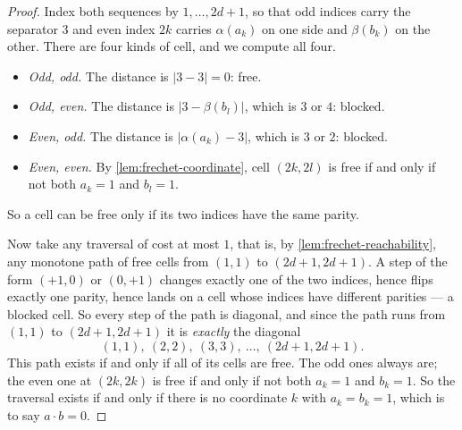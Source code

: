 \begin{proof}
Index both sequences by $1, \ldots, 2d+1$, so that odd indices carry the
separator $3$ and even index $2k$ carries $\alpha(a_k)$ on one side and
$\beta(b_k)$ on the other. There are four kinds of cell, and we compute all
four.
\begin{itemize}[leftmargin=*]
  \item \emph{Odd, odd.} The distance is $|3-3| = 0$: free.
  \item \emph{Odd, even.} The distance is $|3 - \beta(b_l)|$, which is $3$ or
        $4$: blocked.
  \item \emph{Even, odd.} The distance is $|\alpha(a_k) - 3|$, which is $3$ or
        $2$: blocked.
  \item \emph{Even, even.} By \cref{lem:frechet-coordinate}, cell $(2k,2l)$ is
        free if and only if not both $a_k = 1$ and $b_l = 1$.
\end{itemize}
So a cell can be free only if its two indices have the same parity.

Now take any traversal of cost at most $1$, that is, by
\cref{lem:frechet-reachability}, any monotone path of free cells from $(1,1)$
to $(2d+1,2d+1)$. A step of the form $(+1,0)$ or $(0,+1)$ changes exactly one
of the two indices, hence flips exactly one parity, hence lands on a cell whose
indices have different parities --- a blocked cell. So every step of the path
is diagonal, and since the path runs from $(1,1)$ to $(2d+1,2d+1)$ it is
\emph{exactly} the diagonal
\[ (1,1),\ (2,2),\ (3,3),\ \ldots,\ (2d+1,2d+1). \]
This path exists if and only if all of its cells are free. The odd ones always
are; the even one at $(2k,2k)$ is free if and only if not both $a_k = 1$ and
$b_k = 1$. So the traversal exists if and only if there is no coordinate $k$
with $a_k = b_k = 1$, which is to say $a \cdot b = 0$.
\end{proof}

